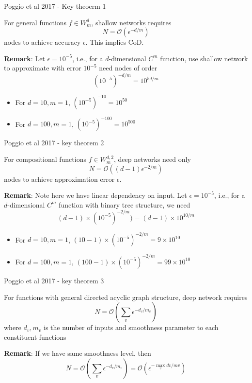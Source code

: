 \documentclass[aspectratio=169]{beamer} %
\begin{document}
\begin{frame}{Poggio et al 2017 - Key theoerm 1}
\begin{theorem}
    For general functions $f\in W_m^d$, shallow networks requires
    $$
    N = \mathcal{O}(\epsilon ^{-d/m})
    $$
    nodes to achieve accuracy $\epsilon$. This implies CoD.
\end{theorem}
    \textbf{Remark}: Let $\epsilon = 10^{-5}$, i.e., for a $d$-dimensional $C^m$ function, use shallow network to approximate with error $10^{-5}$ need nodes of order 
    $$
    (10^{-5})^{-d/m} = 10^{5d/m}
    $$
    \begin{itemize}
        \item For $d=10, m=1$, $(10^{-5})^{-10} = 10^{50}$
        \item For $d=100, m=1$, $(10^{-5})^{-100} = 10^{500}$
    \end{itemize}
\end{frame}
\begin{frame}{Poggio et al 2017 - key theorem 2}
\begin{theorem}
For compositional functions $f\in W^{d,2}_m$, deep networks need only
$$
N = \mathcal{O}((d-1)\epsilon^{-2/m})
$$
nodes to achieve approximation error $\epsilon$. 
\end{theorem}
\textbf{Remark}: Note here we have linear dependency on input. Let $\epsilon = 10^{-5}$, i.e., for a $d$-dimensional $C^m$ function with binary tree structure, we need 
$$
(d-1)\times (10^{-5})^{-2/m}) = (d-1)\times 10^{10/m}
$$
\begin{itemize}
    \item For $d=10, m=1$, $(10-1)\times (10^{-5})^{-2/m} = 9\times 10^{10}$
    \item For $d=100, m=1$, $(100-1)\times (10^{-5})^{-2/m} = 99\times 10^{10}$
\end{itemize}
\end{frame}
\begin{frame}{Poggio et al 2017 - key theorem 3}
    \begin{theorem}
    For functions with general directed acyclic graph structure, deep network requires
    $$
    N = \mathcal{O}(\sum_{v} \epsilon^{-d_v/m_v})
    $$
    where $d_v, m_v$ is the number of inputs and smoothness parameter to each constituent functions
    \end{theorem}
    \textbf{Remark}: If we have same smoothness level, then
    $$
    N = \mathcal{O}(\sum_{v} \epsilon^{-d_v/m_v}) = \mathcal{O}(\epsilon^{-\max_v dv/mv})
    $$
\end{frame}
\end{document}
